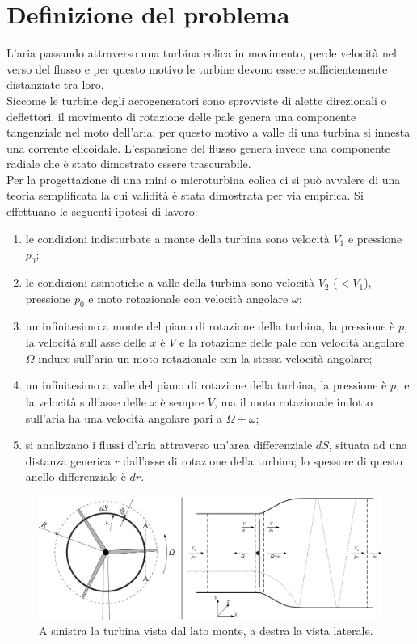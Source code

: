 \section{Definizione del problema}
L'aria passando attraverso una turbina eolica in movimento, perde velocità nel verso del flusso e per questo motivo le turbine devono essere sufficientemente distanziate tra loro.\\
Siccome le turbine degli aerogeneratori sono sprovviste di alette direzionali o deflettori, il movimento di rotazione delle pale genera una componente tangenziale nel moto dell'aria; per questo motivo a valle di una turbina si innesta una corrente elicoidale. L'espansione del flusso genera invece una componente radiale che è stato dimostrato essere trascurabile.\\
Per la progettazione di una mini o microturbina eolica ci si può avvalere di una teoria semplificata la cui validità è stata dimostrata per via empirica. Si effettuano le seguenti ipotesi di lavoro:
\begin{enumerate}
\item le condizioni indisturbate a monte della turbina sono velocità $V_1$ e pressione $p_0$;
\item le condizioni asintotiche a valle della turbina sono velocità $V_2$ ($<V_1$), pressione $p_0$ e moto rotazionale con velocità angolare $\omega$;
\item un infinitesimo a monte del piano di rotazione della turbina, la pressione è $p$, la velocità sull'asse delle $x$ è $V$ e la rotazione delle pale con velocità angolare $\Omega$ induce sull'aria un moto rotazionale con la stessa velocità angolare;
\item un infinitesimo a valle del piano di rotazione della turbina, la pressione è $p_1$ e la velocità sull'asse delle $x$ è sempre $V$, ma il moto rotazionale indotto sull'aria ha una velocità angolare pari a $\Omega+\omega$;
\item si analizzano i flussi d'aria attraverso un'area differenziale $dS$, situata ad una distanza generica $r$ dall'asse di rotazione della turbina; lo spessore di questo anello differenziale è $dr$.
\end{enumerate}
\begin{figure}
\centering
  \includegraphics[width=\textwidth]{fig/frontlatEol.pdf}
\caption{A sinistra la turbina vista dal lato monte, a destra la vista laterale.}
\label{fig:frontlatEol}
\end{figure}
